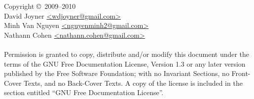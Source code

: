 \noindent Copyright \copyright\ 2009--2010 \\
David Joyner \url{<wdjoyner@gmail.com>} \\
Minh Van Nguyen \url{<nguyenminh2@gmail.com>} \\
Nathann Cohen \url{<nathann.cohen@gmail.com>} \\\\
Permission is granted to copy, distribute and/or modify this document
under the terms of the GNU Free Documentation License, Version 1.3
or any later version published by the Free Software Foundation;
with no Invariant Sections, no Front-Cover Texts, and no
Back-Cover Texts. A copy of the license is included in the section
entitled ``GNU Free Documentation License''.
